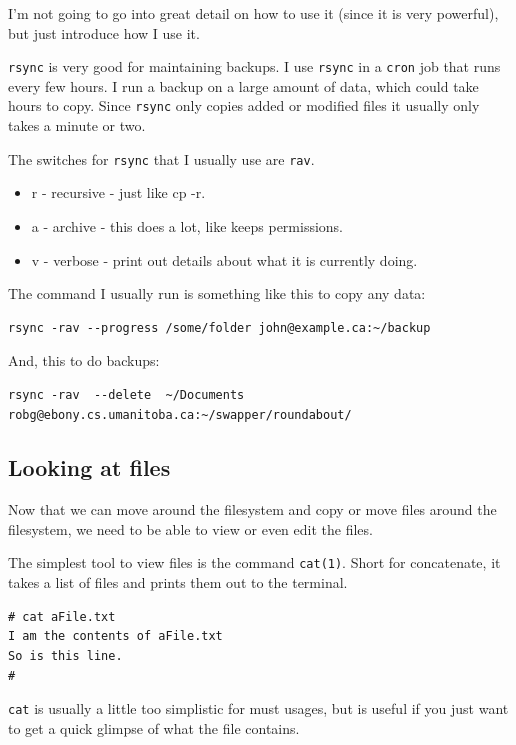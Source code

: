 I'm not going to go into great detail on how to use it (since it is very powerful), but 
just introduce how I use it.

{\tt rsync} is very good for maintaining backups.  I use {\tt rsync} in a 
{\tt cron} job that runs every few hours.
I run a backup on a large amount of data, which could take hours to copy. 
Since {\tt rsync} only copies added or modified files it usually only 
takes a minute or two.

The switches for {\tt rsync} that I usually use are {\tt rav}. 
\begin{itemize}
\item r - recursive - just like cp -r.
\item a - archive - this does a lot, like keeps permissions.
\item v - verbose - print out details about what it is currently doing.
\end{itemize}

The command I usually run is something like this to copy any data:

{\tt \begin{verbatim}
rsync -rav --progress /some/folder john@example.ca:~/backup
\end{verbatim}
}

And, this to do backups:
{\tt \begin{verbatim}
rsync -rav  --delete  ~/Documents robg@ebony.cs.umanitoba.ca:~/swapper/roundabout/
\end{verbatim}
}



\subsection{Looking at files}
Now that we can move around the filesystem and copy or move
files around the filesystem, we need to be able to view
or even edit the files.

The simplest tool to view files is the command {\tt cat(1)}.
Short for concatenate, it takes a list of files and prints them out to
the terminal.

{\tt \begin{verbatim}
# cat aFile.txt
I am the contents of aFile.txt
So is this line.
#
\end{verbatim}
}

{\tt cat} is usually a little too simplistic for must usages,
but is useful if you just want to get a quick glimpse of what 
the file contains.


